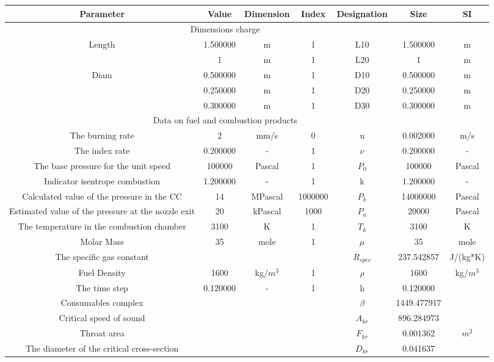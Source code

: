 \begin{center}
\begin{tabular}{  | c | c | c | c | c | c | c | }
\hline
Parameter & Value & Dimension & Index & Designation & Size & SI \\
\hline
\multicolumn{6}{|c}{Dimensions charge} & \\
\hline
Length & 1.500000 & m & 1 & L10 & 1.500000 & m \\
  & 1 & m & 1 & L20 & 1 & m \\
\hline
Diam & 0.500000 & m & 1 & D10 & 0.500000 & m \\
  & 0.250000 & m & 1 & D20 & 0.250000 & m \\
  & 0.300000 & m & 1 & D30 & 0.300000 & m \\
\hline
\multicolumn{6}{|c}{Data on fuel and combustion products} & \\
\hline
The burning rate & 2 & mm/s & 0 & u & 0.002000 & m/s \\
\hline
The index rate & 0.200000 &  -  & 1 & $\nu$ & 0.200000 &  -  \\
\hline
The base pressure for the unit speed & 100000 & Pascal & 1 & $P_0$ & 100000 & Pascal \\
\hline
Indicator isentrope combustion & 1.200000 &  -  & 1 & k & 1.200000 &  -  \\
\hline
Calculated value of the pressure in the CC & 14 & MPascal & 1000000 & $P_k$ & 14000000 & Pascal \\
\hline
Estimated value of the pressure at the nozzle exit & 20 & kPascal & 1000 & $P_a$ & 20000 & Pascal \\
\hline
The temperature in the combustion chamber & 3100 & K & 1 & $T_k$ & 3100 & K \\
\hline
Molar Mass & 35 & mole & 1 & $\mu$ & 35 & mole \\
\hline
The specific gas constant &  &  &  & $R_{spec}$ & 237.542857 & J/(kg*K) \\
\hline
Fuel Density & 1600 & kg/$m^3$ & 1 & $\rho$ & 1600 & kg/$m^3$ \\
\hline
The time step & 0.120000 &  -  & 1 & h & 0.120000 &   \\
\hline
Consumables complex &  &  &  & $\beta$ & 1449.477917 &   \\
\hline
Critical speed of sound &  &  &  & $A_{kr}$ & 896.284973 &   \\
\hline
Throat area &  &  &  & $F_{kr}$ & 0.001362 & $m^2$ \\
\hline
The diameter of the critical cross-section &  &  &  & $D_{kr}$ & 0.041637 &   \\

\end{tabular}
\end{center}
